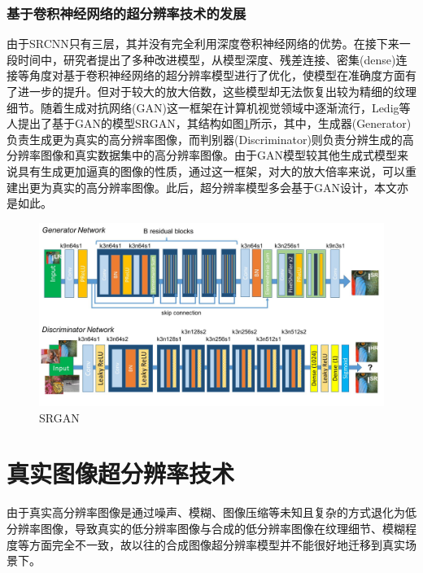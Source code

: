 \subsubsection{基于卷积神经网络的超分辨率技术的发展}
由于SRCNN只有三层，其并没有完全利用深度卷积神经网络的优势。在接下来一段时间中，研究者提出了多种改进模型，从模型深度、残差连接、密集(dense)连接等角度对基于卷积神经网络的超分辨率模型进行了优化，使模型在准确度方面有了进一步的提升。但对于较大的放大倍数，这些模型却无法恢复出较为精细的纹理细节。随着生成对抗网络\parencite{goodfellow2020generative}(GAN)这一框架在计算机视觉领域中逐渐流行，Ledig等人\parencite{fritsche2019frequency}提出了基于GAN的模型SRGAN，其结构如图\ref{fig:SRGAN}所示，其中，生成器(Generator)负责生成更为真实的高分辨率图像，而判别器(Discriminator)则负责分辨生成的高分辨率图像和真实数据集中的高分辨率图像。由于GAN模型较其他生成式模型来说具有生成更加逼真的图像的性质，通过这一框架，对大的放大倍率来说，可以重建出更为真实的高分辨率图像。此后，超分辨率模型多会基于GAN设计，本文亦是如此。

\begin{figure}[htbp]
    \centering
    \includegraphics[width=1.0\textwidth]{imgs/SRGAN.png}
    \caption{SRGAN}
    \label{fig:SRGAN}
\end{figure}

\section{真实图像超分辨率技术}
由于真实高分辨率图像是通过噪声、模糊、图像压缩等未知且复杂的方式退化为低分辨率图像，导致真实的低分辨率图像与合成的低分辨率图像在纹理细节、模糊程度等方面完全不一致，故以往的合成图像超分辨率模型并不能很好地迁移到真实场景下。

